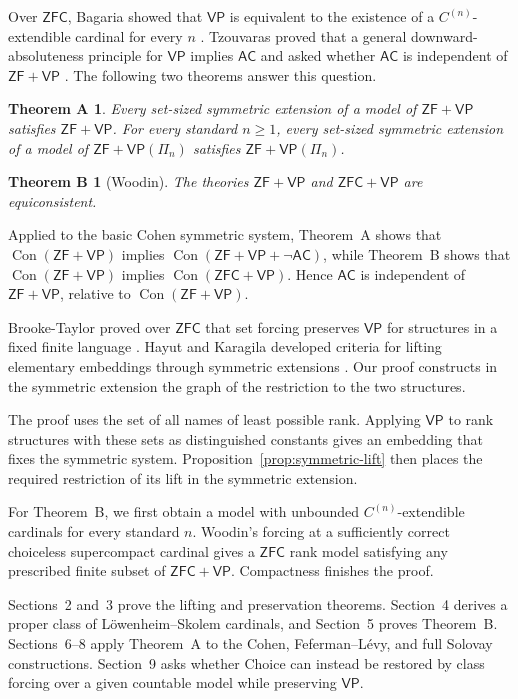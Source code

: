 \documentclass[11pt,a4paper]{amsart}
\DeclareRobustCommand{\revision}[1]{#1}
\newcommand{\VP}{\mathsf{VP}}
\newcommand{\AC}{\mathsf{AC}}
\newcommand{\ZF}{\mathsf{ZF}}
\newcommand{\ZFC}{\mathsf{ZFC}}
\newcommand{\Con}{\operatorname{Con}}
\theoremstyle{plain}
\newtheorem*{thmA}{Theorem A}
\newtheorem*{thmB}{Theorem B}
\theoremstyle{definition}
\theoremstyle{remark}
\begin{document}
Over $\ZFC$, Bagaria showed that $\VP$ is equivalent to the existence of a $C^{(n)}$-extendible cardinal for every $n$ \cite{BagariaCn}.  Tzouvaras proved that a general downward-absoluteness principle for $\VP$ implies $\AC$ and asked whether $\AC$ is independent of $\ZF+\VP$ \cite[Question~4.1]{Tzouvaras}.  The following two theorems answer this question.

\begin{thmA}
Every set-sized symmetric extension of a model of $\ZF+\VP$ satisfies $\ZF+\VP$.  For every standard $n\geq1$, every set-sized symmetric extension of a model of $\ZF+\VP(\Pi_n)$ satisfies $\ZF+\VP(\Pi_n)$.
\end{thmA}

\begin{thmB}[\revision{Woodin}]
The theories $\ZF+\VP$ and $\ZFC+\VP$ are equiconsistent.
\end{thmB}

Applied to the basic Cohen symmetric system, Theorem~A shows that $\Con(\ZF+\VP)$ implies $\Con(\ZF+\VP+\neg\AC)$, while Theorem~B shows that $\Con(\ZF+\VP)$ implies $\Con(\ZFC+\VP)$.  Hence $\AC$ is independent of $\ZF+\VP$, relative to $\Con(\ZF+\VP)$.

Brooke-Taylor proved over $\ZFC$ that set forcing preserves $\VP$ for structures in a fixed finite language \cite[Lemma~23 and Theorem~24]{BrookeTaylor}.  Hayut and Karagila developed criteria for lifting elementary embeddings through symmetric extensions \cite[Theorems~4.7 and~4.9]{HayutKaragila}.  Our proof constructs in the symmetric extension the graph of \revision{the restriction to the two structures}.

The proof uses the set of all names of least possible rank.  Applying $\VP$ to rank structures with these sets as distinguished constants gives an embedding that fixes the symmetric system.  Proposition~\ref{prop:symmetric-lift} then places the required restriction of its lift in the symmetric extension.

For Theorem~B, we first obtain a model with unbounded $C^{(n)}$-extendible cardinals for every standard $n$.  Woodin's forcing at a sufficiently correct choiceless supercompact cardinal gives a $\ZFC$ rank model satisfying any prescribed finite subset of $\ZFC+\VP$.  Compactness finishes the proof.

Sections~2 and~3 prove the lifting and preservation theorems.  Section~4 derives a proper class of L\"owenheim--Skolem cardinals, and Section~5 proves Theorem~B.  Sections~6--8 apply Theorem~A to the Cohen, Feferman--L\'evy, and full Solovay constructions.  Section~9 asks whether Choice can instead be restored by class forcing over a given countable model while preserving $\VP$.
\end{document}
